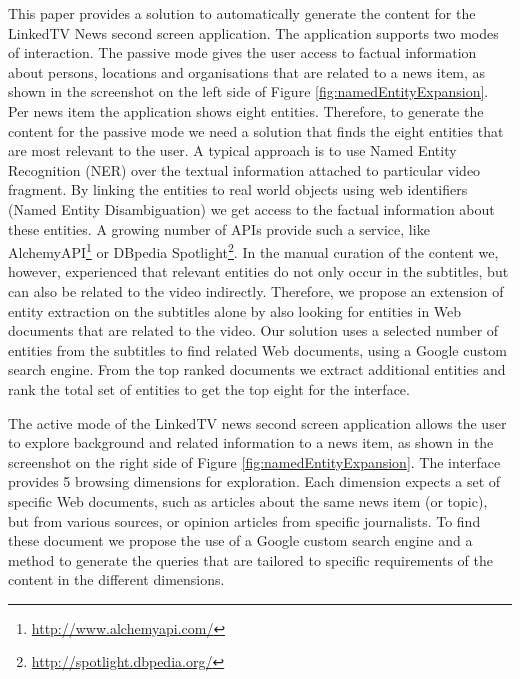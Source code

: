 \documentclass{llncs}
\begin{document}
This paper provides a solution to automatically generate the content for the LinkedTV News second screen application. The application supports two modes of interaction. The passive mode gives the user access to factual information about persons, locations and organisations that are related to a news item, as shown in the screenshot on the left side of Figure \ref{fig:namedEntityExpansion}. Per news item the application shows eight entities. Therefore, to generate the content for the passive mode we need a solution that finds the eight entities that are most relevant to the user. A typical approach is to use Named Entity Recognition (NER) over the textual information attached to particular video fragment. By linking the entities to real world objects using web identifiers (Named Entity Disambiguation) we get access to the factual information about these entities. A growing number of APIs provide such a service, like AlchemyAPI\footnote{\fontsize{8pt}{1em}\selectfont \url{http://www.alchemyapi.com/}} or DBpedia Spotlight\footnote{\fontsize{8pt}{1em}\selectfont \url{http://spotlight.dbpedia.org/}}. %
In the manual curation of the content we, however, experienced that relevant entities do not only occur in the subtitles, but can also be related to the video indirectly. Therefore, we propose an extension of entity extraction on the subtitles alone by also looking for entities in Web documents that are related to the video. Our solution uses a selected number of entities from the subtitles to find related Web documents, using a Google custom search engine. From the top ranked documents we extract additional entities and rank the total set of entities to get the top eight for the interface.

The active mode of the LinkedTV news second screen application allows the user to explore background and related information to a news item, as shown in the screenshot on the right side of Figure \ref{fig:namedEntityExpansion}. The interface provides 5 browsing dimensions for exploration. Each dimension expects a set of specific Web documents, such as articles about the same news item (or topic), but from various sources, or opinion articles from specific journalists. To find these document we propose the use of a Google custom search engine and a method to generate the queries that are tailored to specific requirements of the content in the different dimensions.
\end{document}
